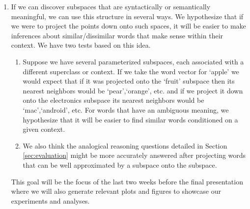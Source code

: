 \begin{enumerate}
\item If we can discover subspaces that are syntactically or semantically meaningful, we can use this structure in several ways. 
We hypothesize that if we were to project the points down onto such spaces, it will be easier to make inferences about similar/dissimilar words that make sense within their context. We have two tests based on this idea.
	\begin{enumerate}
		\item Suppose we have several parameterized subspaces, each associated with a different superclass or context. 
If we take the word vector for `apple' we would expect that if it was projected onto the `fruit' subspace then its nearest neighbors would be `pear',`orange', etc. and if we project it down onto the electronics subspace its nearest neighbors would be `mac',`android', etc. 
For words that have an ambiguous meaning,  we hypothesize that it will be easier to find similar words conditioned on a given context. 
		\item We also think the analogical reasoning questions detailed in Section \ref{sec:evaluation} might be more accurately answered after projecting words that can be well approximated by a subspace onto the subspace. 
	\end{enumerate} 
	
This goal will be the focus of the last two weeks before the final presentation where we will also generate relevant plots and figures to showcase our experiments and analyses.
\end{enumerate}
